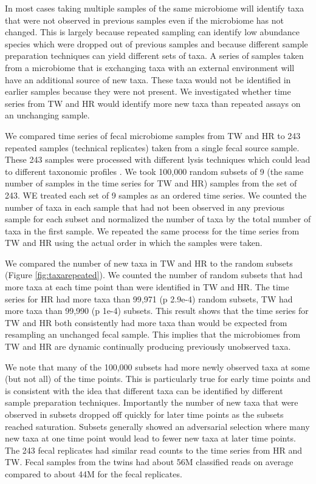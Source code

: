 In most cases taking multiple samples of the same microbiome will identify taxa that were not observed in previous samples even if the microbiome has not changed. This is largely because repeated sampling can identify low abundance species which were dropped out of previous samples and because different sample preparation techniques can yield different sets of taxa. A series of samples taken from a microbiome that is exchanging taxa with an external environment will have an additional source of new taxa. These taxa would not be identified in earlier samples because they were not present. We investigated whether time series from TW and HR would identify more new taxa than repeated assays on an unchanging sample.

We compared time series of fecal microbiome samples from TW and HR to 243 repeated samples (technical replicates) taken from a single fecal source sample. These 243 samples were processed with different lysis techniques which could lead to different taxonomic profiles \citep{Sasada2020}. We took 100,000 random subsets of 9 (the same number of samples in the time series for TW and HR) samples from the set of 243. WE treated each set of 9 samples as an ordered time series. We counted the number of taxa in each sample that had not been observed in any previous sample for each subset and normalized the number of taxa by the total number of taxa in the first sample. We repeated the same process for the time series from TW and HR using the actual order in which the samples were taken.

We compared the number of new taxa in TW and HR to the random subsets (Figure \ref{fig:taxarepeated}). We counted the number of random subsets that had more taxa at each time point than were identified in TW and HR. The time series for HR had more taxa than 99,971 (p 2.9e-4) random subsets, TW had more taxa than 99,990 (p 1e-4) subsets. This result shows that the time series for TW and HR both consistently had more taxa than would be expected from  resampling an unchanged fecal sample. This implies that the microbiomes from TW and HR are dynamic continually producing previously unobserved taxa.

We note that many of the 100,000 subsets had more newly observed taxa at some (but not all) of the time points. This is particularly true for early time points and is consistent with the idea that different taxa can be identified by different sample preparation techniques. Importantly the number of new taxa that were observed in subsets dropped off quickly for later time points as the subsets reached saturation. Subsets generally showed an adversarial selection where many new taxa at one time point would lead to fewer new taxa at later time points. The 243 fecal replicates had similar read counts to the time series from HR and TW. Fecal samples from the twins had about 56M classified reads on average compared to about 44M for the fecal replicates.

